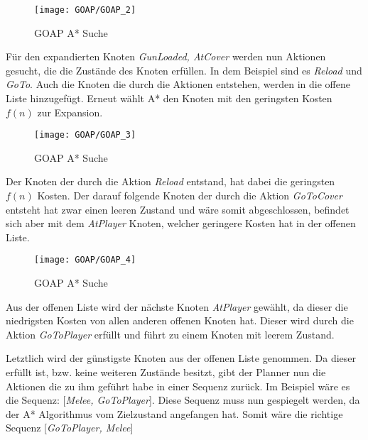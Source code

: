 \begin{figure}[h]
  \centering
  \texttt{[image: GOAP/GOAP\_2]}
	\captionsetup{justification=justified, format=plain}
  \caption{GOAP A* Suche}
  \label{GOAP A* Suche: Erste Aktionen}
\end{figure}

Für den expandierten Knoten \textit{GunLoaded, AtCover} werden nun Aktionen gesucht, die die Zustände des Knoten erfüllen. In dem Beispiel sind es \textit{Reload} und \textit{GoTo}. Auch die Knoten die durch die Aktionen entstehen, werden in die offene Liste hinzugefügt. Erneut wählt A* den Knoten mit den geringsten Kosten $f(n)$ zur Expansion.
\clearpage

\begin{figure}[h]
  \centering
  \texttt{[image: GOAP/GOAP\_3]}
	\captionsetup{justification=justified, format=plain}
  \caption{GOAP A* Suche}
  \label{GOAP A* Suche: Erste Aktionen}
\end{figure}

Der Knoten der durch die Aktion \textit{Reload} entstand, hat dabei die geringsten $f(n)$ Kosten. Der darauf folgende Knoten der durch die Aktion \textit{GoToCover} entsteht hat zwar einen leeren Zustand und wäre somit abgeschlossen, befindet sich aber mit dem \textit{AtPlayer} Knoten, welcher geringere Kosten hat in der offenen Liste.
\clearpage

\begin{figure}[h]
  \centering
  \texttt{[image: GOAP/GOAP\_4]}
	\captionsetup{justification=justified, format=plain}
  \caption{GOAP A* Suche}
  \label{GOAP A* Suche: Erste Aktionen}
\end{figure}

Aus der offenen Liste wird der nächste Knoten \textit{AtPlayer} gewählt, da dieser die niedrigsten Kosten von allen anderen offenen Knoten hat. Dieser wird durch die Aktion \textit{GoToPlayer} erfüllt und führt zu einem Knoten mit leerem Zustand.

Letztlich wird der günstigste Knoten aus der offenen Liste genommen. Da dieser erfüllt ist, bzw. keine weiteren Zustände besitzt, gibt der Planner nun die Aktionen die zu ihm geführt habe in einer Sequenz zurück. Im Beispiel wäre es die Sequenz: [\textit{Melee, GoToPlayer}]. Diese Sequenz muss nun gespiegelt werden, da der A* Algorithmus vom Zielzustand angefangen hat. Somit wäre die richtige Sequenz [\textit{GoToPlayer, Melee}]
\clearpage

